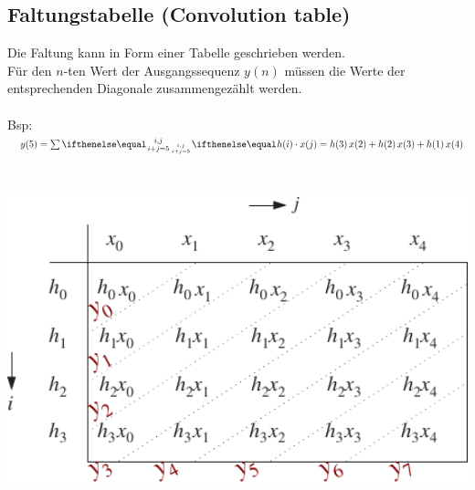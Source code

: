 	\subsection{Faltungstabelle (Convolution table)}
		\begin{minipage}{0.57\textwidth}
			Die Faltung kann in Form einer Tabelle geschrieben werden.\\[0.2cm]
			Für den $n$-ten Wert der Ausgangssequenz $y(n)$ müssen die Werte der entsprechenden Diagonale zusammengezählt werden.\\[0.2cm]
			\\[0.4cm]
			Bsp: $\quad y(5) = \mysum{i,j\atop i+j=5}{}{h(i)\cdot x(j)} = h(3)\,x(2) + h(2)\,x(3) + h(1)\,x(4)$
		\end{minipage}
		\begin{minipage}{0.01\textwidth}$ $\end{minipage}
		\begin{minipage}{0.4\textwidth}
		 	\includegraphics[width = 1\textwidth]{pic/convTab.pdf}
		\end{minipage}


